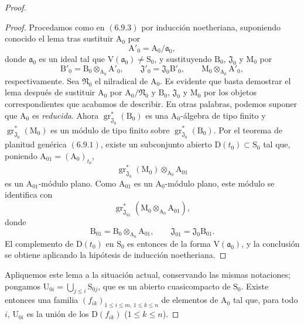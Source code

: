 \begin{proof}
\begin{proof}
Procedamos como en $(6.9.3)$ por inducción noetheriana, suponiendo conocido el lema tras sustituir $\mathrm{A}_0$ por
\[
  \mathrm{A}'_0=\mathrm{A}_0/\mathfrak{a}_0,
\]
donde $\mathfrak{a}_0$ es un ideal tal que $\mathrm{V}(\mathfrak{a}_0)\neq\mathrm{S}_0$, y sustituyendo $\mathrm{B}_0$, $\mathfrak{J}_0$ y $\mathrm{M}_0$ por
\[
  \mathrm{B}'_0=\mathrm{B}_0\otimes_{\mathrm{A}_0}\mathrm{A}'_0,
  \qquad
  \mathfrak{J}'_0=\mathfrak{J}_0\mathrm{B}'_0,
  \qquad
  \mathrm{M}_0\otimes_{\mathrm{A}_0}\mathrm{A}'_0,
\]
respectivamente. Sea $\mathfrak{N}_0$ el nilradical de $\mathrm{A}_0$. Es
evidente que basta demostrar el lema después de sustituir $\mathrm{A}_0$ por
$\mathrm{A}_0/\mathfrak{N}_0$ y $\mathrm{B}_0$,
$\mathfrak{J}_0$ y $\mathrm{M}_0$ por los objetos correspondientes que acabamos
de describir. En otras palabras, podemos suponer que $\mathrm{A}_0$ es
\emph{reducida}. Ahora
$\operatorname{gr}^*_{\mathfrak{J}_0}(\mathrm{B}_0)$ es una
$\mathrm{A}_0$-álgebra de tipo finito y
$\operatorname{gr}^*_{\mathfrak{J}_0}(\mathrm{M}_0)$ es un módulo de tipo finito sobre
$\operatorname{gr}^*_{\mathfrak{J}_0}(\mathrm{B}_0)$. Por el teorema de
planitud genérica $(6.9.1)$, existe un subconjunto abierto
$\mathrm{D}(t_0)\subset\mathrm{S}_0$ tal que, poniendo
$\mathrm{A}_{01}=(\mathrm{A}_0)_{t_0}$,
\[
  \operatorname{gr}^*_{\mathfrak{J}_0}(\mathrm{M}_0)
  \otimes_{\mathrm{A}_0}\mathrm{A}_{01}
\]
es un $\mathrm{A}_{01}$-módulo plano. Como $\mathrm{A}_{01}$ es un $\mathrm{A}_0$-módulo plano, este módulo se identifica con
\[
  \operatorname{gr}^*_{\mathfrak{J}_{01}}
  (\mathrm{M}_0\otimes_{\mathrm{A}_0}\mathrm{A}_{01}),
\]
donde
\[
  \mathrm{B}_{01}=\mathrm{B}_0\otimes_{\mathrm{A}_0}\mathrm{A}_{01},
  \qquad
  \mathfrak{J}_{01}=\mathfrak{J}_0\mathrm{B}_{01}.
\]
El complemento de $\mathrm{D}(t_0)$ en $\mathrm{S}_0$ es entonces de la forma $\mathrm{V}(\mathfrak{a}_0)$, y la conclusión se obtiene aplicando la hipótesis de inducción noetheriana.
\end{proof}

Apliquemos este lema a la situación actual, conservando las mismas notaciones; pongamos $\mathrm{U}_{0i}=\bigcup_{j\leqslant i}\mathrm{S}_{0j}$, que es un abierto cuasicompacto de $\mathrm{S}_0$. Existe entonces una familia $(f_{ik})_{1\leqslant i\leqslant m,\,1\leqslant k\leqslant n}$ de elementos de $\mathrm{A}_0$ tal que, para todo $i$, $\mathrm{U}_{0i}$ es la unión de los $\mathrm{D}(f_{ik})$ ($1\leqslant k\leqslant n$).



\end{proof}
